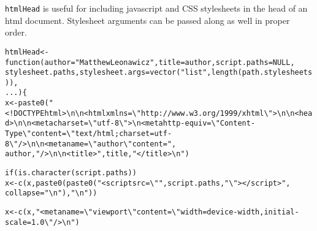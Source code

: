 \documentclass{article}\usepackage[]{graphicx}\usepackage[]{color}
\makeatletter
\newcommand{\hlstr}[1]{\textcolor[rgb]{0.863,0.196,0.184}{#1}}%
\newcommand{\hlstd}[1]{\textcolor[rgb]{0.514,0.58,0.588}{#1}}%
\newcommand{\hlkwa}[1]{\textcolor[rgb]{0.796,0.294,0.086}{#1}}%
\newcommand{\hlkwb}[1]{\textcolor[rgb]{0.522,0.6,0}{#1}}%
\newcommand{\hlkwc}[1]{\textcolor[rgb]{0.796,0.294,0.086}{#1}}%
\newcommand{\hlkwd}[1]{\textcolor[rgb]{0.576,0.631,0.631}{#1}}%
\newenvironment{kframe}{%
 \def\at@end@of@kframe{}%
 \ifinner\ifhmode%
  \def\at@end@of@kframe{\end{minipage}}%
  \begin{minipage}{\columnwidth}%
 \fi\fi%
 \def\FrameCommand##1{\hskip\@totalleftmargin \hskip-\fboxsep
 \colorbox{shadecolor}{##1}\hskip-\fboxsep
     \hskip-\linewidth \hskip-\@totalleftmargin \hskip\columnwidth}%
 \MakeFramed {\advance\hsize-\width
   \@totalleftmargin\z@ \linewidth\hsize
   \@setminipage}}%
 {\par\unskip\endMakeFramed%
 \at@end@of@kframe}
\newenvironment{knitrout}{}{} %
\makeatother
\begin{document}
\texttt{htmlHead} is useful for including javascript and CSS stylesheets in the head of an html document.
Stylesheet arguments can be passed along as well in proper order.

\begin{knitrout}
\color{fgcolor}\begin{kframe}
\begin{alltt}
\hlstd{htmlHead} \hlkwb{<-} \hlkwa{function}\hlstd{(}\hlkwc{author} \hlstd{=} \hlstr{"Matthew Leonawicz"}\hlstd{,} \hlkwc{title} \hlstd{= author,} \hlkwc{script.paths} \hlstd{=} \hlkwa{NULL}\hlstd{,}
    \hlkwc{stylesheet.paths}\hlstd{,} \hlkwc{stylesheet.args} \hlstd{=} \hlkwd{vector}\hlstd{(}\hlstr{"list"}\hlstd{,} \hlkwd{length}\hlstd{(path.stylesheets)),}
    \hlkwc{...}\hlstd{) \{}
    \hlstd{x} \hlkwb{<-} \hlkwd{paste0}\hlstd{(}\hlstr{"<!DOCTYPE html>\textbackslash{}n\textbackslash{}n<html xmlns=\textbackslash{}"http://www.w3.org/1999/xhtml\textbackslash{}">\textbackslash{}n\textbackslash{}n<head>\textbackslash{}n\textbackslash{}n<meta charset=\textbackslash{}"utf-8\textbackslash{}">\textbackslash{}n<meta http-equiv=\textbackslash{}"Content-Type\textbackslash{}" content=\textbackslash{}"text/html; charset=utf-8\textbackslash{}" />\textbackslash{}n\textbackslash{}n<meta name=\textbackslash{}"author\textbackslash{}" content="}\hlstd{,}
        \hlstd{author,} \hlstr{" />\textbackslash{}n\textbackslash{}n<title>"}\hlstd{, title,} \hlstr{"</title>\textbackslash{}n"}\hlstd{)}

    \hlkwa{if} \hlstd{(}\hlkwd{is.character}\hlstd{(script.paths))}
        \hlstd{x} \hlkwb{<-} \hlkwd{c}\hlstd{(x,} \hlkwd{paste0}\hlstd{(}\hlkwd{paste0}\hlstd{(}\hlstr{"<script src=\textbackslash{}""}\hlstd{, script.paths,} \hlstr{"\textbackslash{}"></script>"}\hlstd{,}
            \hlkwc{collapse} \hlstd{=} \hlstr{"\textbackslash{}n"}\hlstd{),} \hlstr{"\textbackslash{}n"}\hlstd{))}

    \hlstd{x} \hlkwb{<-} \hlkwd{c}\hlstd{(x,} \hlstr{"<meta name=\textbackslash{}"viewport\textbackslash{}" content=\textbackslash{}"width=device-width, initial-scale=1.0\textbackslash{}" />\textbackslash{}n"}\hlstd{)}


\end{alltt}
\end{kframe}
\end{knitrout}
\end{document}
